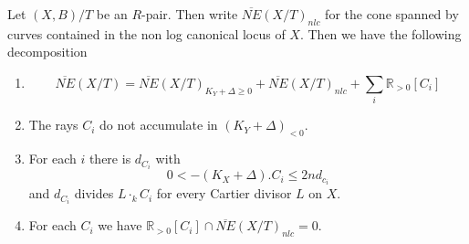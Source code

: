	\begin{theorem}\label{NLCT}
	Let $(X,B)/T$ be an $R$-pair. Then write $\overline{NE}(X/T)_{nlc}$ for the cone spanned by curves contained in the non log canonical locus of $X$. Then we have the following decomposition
	
		\begin{enumerate}
		\item $$\overline{NE}(X/T)=\overline{NE}(X/T)_{K_{Y}+\Delta \geq 0} +\overline{NE}(X/T)_{nlc}+ \sum_{i} \mathbb{R}_{>0}[C_{i}]$$
		\item The rays $C_{i}$ do not accumulate in $(K_{Y}+\Delta)_{<0}$.
		\item For each $i$ there is $d_{C_{i}}$ with 
		\[0 < -(K_{X}+\Delta).C_{i} \leq 2nd_{c_{i}}\]
		and $d_{C_{i}}$ divides $L\cdot_{k}C_{i}$ for every Cartier divisor $L$ on $X$.
		\item For each $C_{i}$ we have $\mathbb{R}_{>0}[C_{i}] \cap \overline{NE}(X/T)_{nlc} = {0}$.
	\end{enumerate}
\end{theorem}
